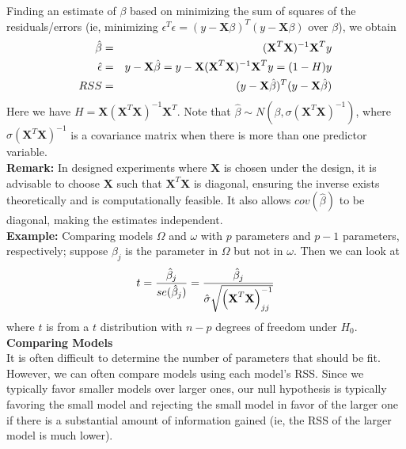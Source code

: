 \documentclass[11pt]{article}
\begin{document}
Finding an estimate of $\beta$ based on minimizing the sum of squares of the residuals/errors (ie, minimizing $\epsilon^T\epsilon = (y-\textbf{X}\beta)^T(y-\textbf{X}\beta)$ over $\beta$), we obtain
\begin{eqnarray}
\hat{\beta} &=& (\textbf{X}^T\textbf{X})^{-1}\textbf{X}^Ty  \notag \\
\hat{\epsilon} &=& y-\textbf{X}\hat{\beta} = y-\textbf{X}(\textbf{X}^T\textbf{X})^{-1}\textbf{X}^Ty = (1-H)y \notag \\
RSS &=&  (y-\textbf{X}\hat{\beta})^T(y-\textbf{X}\hat{\beta}) \notag
\end{eqnarray}
Here we have $H=\textbf{X}(\textbf{X}^T\textbf{X})^{-1}\textbf{X}^T  $. Note that $\hat{\beta} \sim N(\beta,\sigma(\textbf{X}^T\textbf{X})^{-1})$, where $\sigma(\textbf{X}^T\textbf{X})^{-1}$ is a covariance matrix when there is more than one predictor variable. \\

\noindent\textbf{Remark:} In designed experiments where $\textbf{X}$ is chosen under the design, it is advisable to choose $\textbf{X}$ such that $\textbf{X}^T\textbf{X}$ is diagonal, ensuring the inverse exists theoretically and is computationally feasible. It also allows $cov(\hat{\beta})$ to be diagonal, making the estimates independent. \\

\noindent\textbf{Example:} Comparing models $\Omega$ and $\omega$ with $p$ parameters and $p-1$ parameters, respectively; suppose $\beta_j$ is the parameter in $\Omega$ but not in $\omega$. Then we can look at
\begin{eqnarray}
t = \frac{\hat{\beta}_j}{se(\hat{\beta}_j)} = \frac{\hat{\beta}_j}{\hat{\sigma}\sqrt{\left( \textbf{X}^T\textbf{X} \right)^{-1}_{jj}}} \notag
\end{eqnarray}
where $t$ is from a $t$ distribution with $n-p$ degrees of freedom under $H_0$. \\

\noindent\textbf{Comparing Models} \\

It is often difficult to determine the number of parameters that should be fit. However, we can often compare models using each model's RSS. Since we typically favor smaller models over larger ones, our null hypothesis is typically favoring the small model and rejecting the small model in favor of the larger one if there is a substantial amount of information gained (ie, the RSS of the larger model is much lower). \\
\end{document}
